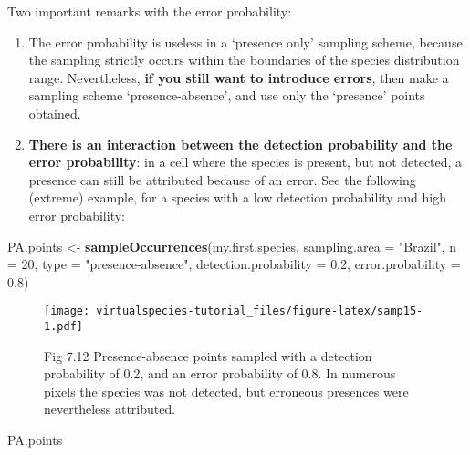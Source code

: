 \documentclass[]{article}
\newenvironment{Shaded}{\begin{snugshade}}{\end{snugshade}}
\newcommand{\KeywordTok}[1]{\textcolor[rgb]{0.13,0.29,0.53}{\textbf{#1}}}
\newcommand{\DataTypeTok}[1]{\textcolor[rgb]{0.13,0.29,0.53}{#1}}
\newcommand{\DecValTok}[1]{\textcolor[rgb]{0.00,0.00,0.81}{#1}}
\newcommand{\FloatTok}[1]{\textcolor[rgb]{0.00,0.00,0.81}{#1}}
\newcommand{\StringTok}[1]{\textcolor[rgb]{0.31,0.60,0.02}{#1}}
\newcommand{\NormalTok}[1]{#1}
\begin{document}
Two important remarks with the error probability:

\begin{enumerate}
\def\labelenumi{\arabic{enumi}.}
\item
  The error probability is useless in a `presence only' sampling scheme,
  because the sampling strictly occurs within the boundaries of the
  species distribution range. Nevertheless, \textbf{if you still want to
  introduce errors}, then make a sampling scheme `presence-absence', and
  use only the `presence' points obtained.
\item
  \textbf{There is an interaction between the detection probability and
  the error probability}: in a cell where the species is present, but
  not detected, a presence can still be attributed because of an error.
  See the following (extreme) example, for a species with a low
  detection probability and high error probability:
\end{enumerate}

\begin{Shaded}
\begin{Highlighting}[]
\NormalTok{PA.points <-}\StringTok{ }\KeywordTok{sampleOccurrences}\NormalTok{(my.first.species,}
                               \DataTypeTok{sampling.area =} \StringTok{"Brazil"}\NormalTok{,}
                               \DataTypeTok{n =} \DecValTok{20}\NormalTok{,}
                               \DataTypeTok{type =} \StringTok{"presence-absence"}\NormalTok{,}
                               \DataTypeTok{detection.probability =} \FloatTok{0.2}\NormalTok{,}
                               \DataTypeTok{error.probability =} \FloatTok{0.8}\NormalTok{)}
\end{Highlighting}
\end{Shaded}

\begin{figure}
\centering
\texttt{[image: virtualspecies-tutorial\_files/figure-latex/samp15-1.pdf]}
\caption{Fig 7.12 Presence-absence points sampled with a detection
probability of 0.2, and an error probability of 0.8. In numerous pixels
the species was not detected, but erroneous presences were nevertheless
attributed.}
\end{figure}

\begin{Shaded}
\begin{Highlighting}[]
\NormalTok{PA.points}
\end{Highlighting}
\end{Shaded}
\end{document}
